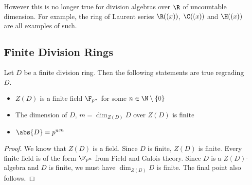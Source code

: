 \documentclass[a4paper]{article}
\begin{document}
However this is no longer true for division algebras over $\R$ of uncountable dimension. For example, the ring of Laurent series $\R((x))$, $\C((x))$ and $\H((x))$ are all examples of such. 

\subsection{Finite Division Rings}
\begin{crl}{}{} Let $D$ be a finite division ring. Then the following statements are true regrading $D$. 
\begin{itemize}
\item $Z(D)$ is a finite field $\F_{p^n}$ for some $n\in\N\setminus\{0\}$
\item The dimension of $D$, $m=\dim_{Z(D)}D$ over $Z(D)$ is finite
\item $\abs{D}={p^n}^m$
\end{itemize} 
\begin{proof}
We know that $Z(D)$ is a field. Since $D$ is finite, $Z(D)$ is finite. Every finite field is of the form $\F_{p^n}$ from Field and Galois theory. Since $D$ is a $Z(D)$-algebra and $D$ is finite, we must have $\dim_{Z(D)}D$ is finite. The final point also follows. 
\end{proof}
\end{crl}
\end{document}
